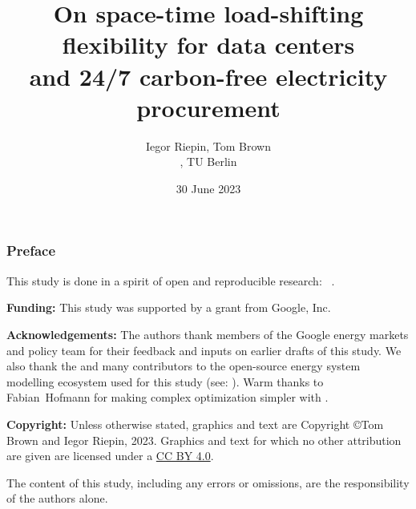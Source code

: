 


\title{On space-time load-shifting flexibility for data centers \\ 
      and 24/7 carbon-free electricity procurement}

\author{
  Iegor Riepin, Tom Brown\\
  , TU Berlin
  }

\date{30 June 2023}




\maketitle

\begin{frame}
  \frametitle{Preface}

  \begin{itemize}
    {\small
    \item This study is done in a spirit of open and reproducible research: \faGithub~.
    \item {\bf Funding:} This study was supported by a grant from Google, Inc. 
    \item {\bf Acknowledgements:} The authors thank members of the Google energy markets and policy team 
    for their feedback and inputs on earlier drafts of this study. 
    We also thank the  and many contributors to the open-source 
    energy system modelling ecosystem used for this study (see: ).
    Warm thanks to Fabian~Hofmann for making complex optimization simpler with . 
    \item 
    {\bf Copyright:} Unless otherwise stated, graphics and text are Copyright \copyright Tom Brown and Iegor Riepin, 2023.
    Graphics and text for which no other attribution are given are licensed under a 
    \href{https://creativecommons.org/licenses/by/4.0/}{CC BY 4.0}.  {\footnotesize \ccby} 
    \item The content of this study, including any errors or omissions, are the responsibility
    of the authors alone.
    }
  \end{itemize}

\end{frame}


